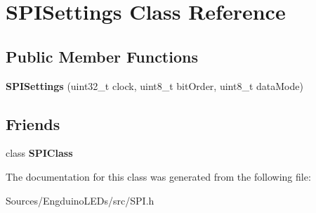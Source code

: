 \hypertarget{class_s_p_i_settings}{}\section{S\+P\+I\+Settings Class Reference}
\label{class_s_p_i_settings}
\subsection*{Public Member Functions}
\begin{DoxyCompactItemize}
\item 
\hypertarget{class_s_p_i_settings_a2931bc80dcaaaf0abc6a28cdc6feb49b}{}{\bfseries S\+P\+I\+Settings} (uint32\+\_\+t clock, uint8\+\_\+t bit\+Order, uint8\+\_\+t data\+Mode)\label{class_s_p_i_settings_a2931bc80dcaaaf0abc6a28cdc6feb49b}

\end{DoxyCompactItemize}
\subsection*{Friends}
\begin{DoxyCompactItemize}
\item 
\hypertarget{class_s_p_i_settings_a8c9e29aa86ce7fe7f779f66d9404c015}{}class {\bfseries S\+P\+I\+Class}\label{class_s_p_i_settings_a8c9e29aa86ce7fe7f779f66d9404c015}

\end{DoxyCompactItemize}


The documentation for this class was generated from the following file\+:\begin{DoxyCompactItemize}
\item 
Sources/\+Engduino\+L\+E\+Ds/src/S\+P\+I.\+h\end{DoxyCompactItemize}
